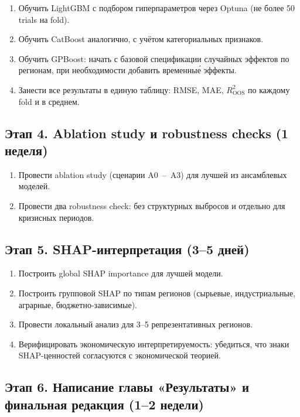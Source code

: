 \documentclass[12pt,a4paper]{article}
\begin{document}
\begin{enumerate}
  \item Обучить LightGBM с подбором гиперпараметров через Optuna
        (не более 50 trials на fold).
  \item Обучить CatBoost аналогично, с учётом категориальных признаков.
  \item Обучить GPBoost: начать с базовой спецификации случайных эффектов
        по регионам, при необходимости добавить временны\'{е} эффекты.
  \item Занести все результаты в единую таблицу: RMSE, MAE,
        $R^2_{\mathrm{OOS}}$ по каждому fold и в среднем.
\end{enumerate}

\subsection*{Этап 4. Ablation study и robustness checks (1 неделя)}

\begin{enumerate}
  \item Провести ablation study (сценарии A0~--~A3) для лучшей из
        ансамблевых моделей.
  \item Провести два robustness check: без структурных выбросов
        и отдельно для кризисных периодов.
\end{enumerate}

\subsection*{Этап 5. SHAP-интерпретация (3--5 дней)}

\begin{enumerate}
  \item Построить global SHAP importance для лучшей модели.
  \item Построить групповой SHAP по типам регионов (сырьевые,
        индустриальные, аграрные, бюджетно-зависимые).
  \item Провести локальный анализ для 3--5 репрезентативных регионов.
  \item Верифицировать экономическую интерпретируемость: убедиться,
        что знаки SHAP-ценностей согласуются с экономической теорией.
\end{enumerate}

\subsection*{Этап 6. Написание главы «Результаты» и финальная редакция (1--2 недели)}
\end{document}
